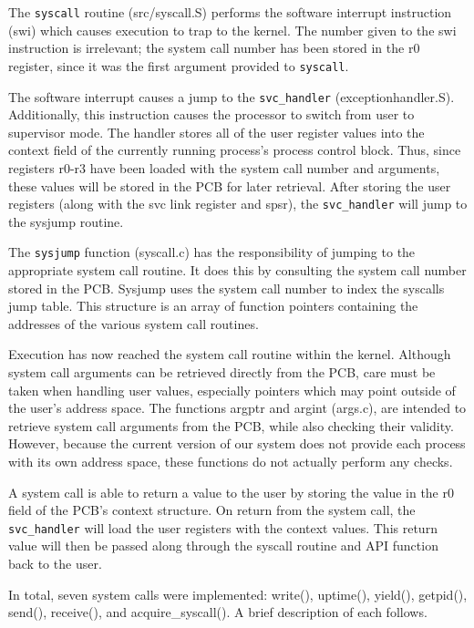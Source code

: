 \documentclass[12pt]{article}
\newcommand{\code}[1]{\colorbox{codegray}{\texttt{\footnotesize{#1}}}}
\begin{document}
The \code{syscall} routine (src/syscall.S) performs the software
interrupt instruction (swi) which causes execution to trap to the
kernel. The number given to the swi instruction is irrelevant; 
the system call number has been stored in the r0 register, since it 
was the first argument provided to \code{syscall}.

The software interrupt causes a jump to the \code{svc\_handler}
(exceptionhandler.S).  Additionally, this instruction causes the
processor to switch from user to supervisor mode. The handler
stores all of the user register values into the context field of the
currently running process's process control block. Thus, since
registers r0-r3 have been loaded with the system call number and
arguments, these values will be stored in the PCB for later retrieval.
After storing the user registers (along with the svc link register and
spsr), the \code{svc\_handler} will jump to the sysjump routine.

The \code{sysjump} function (syscall.c) has the responsibility of jumping to
the appropriate system call routine. It does this by consulting the
system call number stored in the PCB\@. Sysjump uses the system call
number to index the syscalls jump table. This structure is an array of
function pointers containing the addresses of the various system call
routines.

Execution has now reached the system call routine within the kernel.
Although system call arguments can be retrieved directly from the PCB,
care must be taken when handling user values, especially pointers which
may point outside of the user's address space. The functions argptr and
argint (args.c), are intended to retrieve system call arguments from
the PCB, while also checking their validity. However, because the
current version of our system does not provide each process with its
own address space, these functions do not actually perform any checks.

A system call is able to return a value to the user by storing the
value in the r0 field of the PCB's context structure. On return from
the system call, the \code{svc\_handler} will load the user registers with the
context values. This return value will then be passed along through the
syscall routine and API function back to the user.

In total, seven system calls were implemented: write(), uptime(),
yield(), getpid(), send(), receive(), and acquire\_syscall(). A brief
description of each follows.
\end{document}
